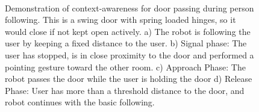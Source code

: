 \documentclass{tADR2e}
\begin{document}
\begin{figure}[ht!]
\centering
%
         \\
    \caption{Demonstration of context-awareness for door passing during person following. This is a swing door with spring loaded hinges, so it would close if not kept open actively. a) The robot is following the user by keeping a fixed distance to the user. b) Signal phase: The user has stopped, is in close proximity to the door and performed a pointing gesture toward the other room. c) Approach Phase: The robot passes the door while the user is holding the door d) Release Phase: User has more than a threshold distance to the door, and robot continues with the basic following.}
   \label{fig:situtation_aware_door_passing}
\end{figure}
\end{document}
